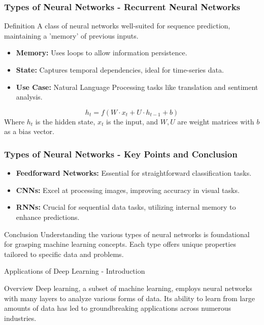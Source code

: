 \documentclass[aspectratio=169]{beamer}
\begin{document}
\begin{frame}[fragile]
    \frametitle{Types of Neural Networks - Recurrent Neural Networks}
    \begin{block}{Definition}
        A class of neural networks well-suited for sequence prediction, maintaining a 'memory' of previous inputs.
    \end{block}
    \begin{itemize}
        \item \textbf{Memory:} Uses loops to allow information persistence.
        \item \textbf{State:} Captures temporal dependencies, ideal for time-series data.
        \item \textbf{Use Case:} Natural Language Processing tasks like translation and sentiment analysis.
    \end{itemize}
    \begin{equation}
        h_t = f(W \cdot x_t + U \cdot h_{t-1} + b)
    \end{equation}
    Where \( h_t \) is the hidden state, \( x_t \) is the input, and \( W, U \) are weight matrices with \( b \) as a bias vector.
\end{frame}

\begin{frame}[fragile]
    \frametitle{Types of Neural Networks - Key Points and Conclusion}
    \begin{itemize}
        \item \textbf{Feedforward Networks:} Essential for straightforward classification tasks.
        \item \textbf{CNNs:} Excel at processing images, improving accuracy in visual tasks.
        \item \textbf{RNNs:} Crucial for sequential data tasks, utilizing internal memory to enhance predictions.
    \end{itemize}
    \begin{block}{Conclusion}
        Understanding the various types of neural networks is foundational for grasping machine learning concepts. Each type offers unique properties tailored to specific data and problems.
    \end{block}
\end{frame}

\begin{frame}[fragile]{Applications of Deep Learning - Introduction}
    \begin{block}{Overview}
        Deep learning, a subset of machine learning, employs neural networks with many layers to analyze various forms of data. Its ability to learn from large amounts of data has led to groundbreaking applications across numerous industries.
    \end{block}
\end{frame}
\end{document}
